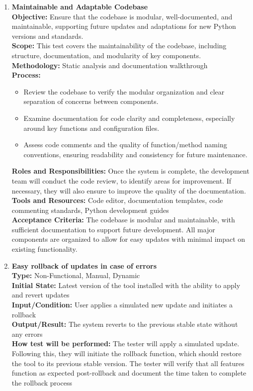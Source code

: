 \documentclass[12pt, titlepage]{article}
\begin{document}
\begin{enumerate}[label={\bf \textcolor{Maroon}{test-MS-\arabic*}}, wide=0pt, font=\itshape]
    \item \textbf{Maintainable and Adaptable Codebase} \\[2mm]
    \textbf{Objective:} Ensure that the codebase is modular, well-documented, and maintainable, supporting future updates and adaptations for new Python versions and standards. \\[2mm]
    \textbf{Scope:} This test covers the maintainability of the codebase, including structure, documentation, and modularity of key components. \\[2mm]
    \textbf{Methodology:} Static analysis and documentation walkthrough \\[2mm]
    \textbf{Process:}
    \begin{itemize}
      \item Review the codebase to verify the modular organization and clear separation of concerns between components.
      \item Examine documentation for code clarity and completeness, especially around key functions and configuration files.
      \item Assess code comments and the quality of function/method naming conventions, ensuring readability and consistency for future maintenance.
    \end{itemize}
    \textbf{Roles and Responsibilities:} Once the system is complete, the development team will conduct the code review, to identify areas for improvement. If necessary, they will also ensure to improve the quality of the documentation. \\[2mm]
    \textbf{Tools and Resources:} Code editor, documentation templates, code commenting standards, Python development guides \\[2mm]
    \textbf{Acceptance Criteria:} The codebase is modular and maintainable, with sufficient documentation to support future development. All major components are organized to allow for easy updates with minimal impact on existing functionality.
  
  \item \textbf{Easy rollback of updates in case of errors} \\[2mm]
    \textbf{Type:} Non-Functional, Manual, Dynamic \\
    \textbf{Initial State:} Latest version of the tool installed with the ability to apply and revert updates \\
    \textbf{Input/Condition:} User applies a simulated new update and initiates a rollback \\
    \textbf{Output/Result:} The system reverts to the previous stable state without any errors \\[2mm]
    \textbf{How test will be performed:} The tester will apply a simulated update. Following this, they will initiate the rollback function, which should restore the tool to its previous stable version. The tester will verify that all features function as expected post-rollback and document the time taken to complete the rollback process
\end{enumerate}
\end{document}
